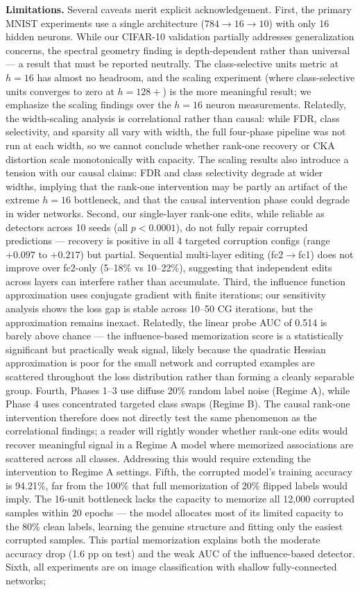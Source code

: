 \documentclass{article}
\begin{document}
\textbf{Limitations.} Several caveats merit explicit acknowledgement. First, the primary MNIST experiments use a single architecture ($784\to16\to10$) with only 16 hidden neurons. While our CIFAR-10 validation partially addresses generalization concerns, the spectral geometry finding is depth-dependent rather than universal — a result that must be reported neutrally. The class-selective units metric at $h=16$ has almost no headroom, and the scaling experiment (where class-selective units converges to zero at $h=128+$) is the more meaningful result; we emphasize the scaling findings over the $h=16$ neuron measurements. Relatedly, the width-scaling analysis is correlational rather than causal: while FDR, class selectivity, and sparsity all vary with width, the full four-phase pipeline was not run at each width, so we cannot conclude whether rank-one recovery or CKA distortion scale monotonically with capacity. The scaling results also introduce a tension with our causal claims: FDR and class selectivity degrade at wider widths, implying that the rank-one intervention may be partly an artifact of the extreme $h=16$ bottleneck, and that the causal intervention phase could degrade in wider networks. Second, our single-layer rank-one edits, while reliable as detectors across 10 seeds (all $p<0.0001$), do not fully repair corrupted predictions — recovery is positive in all 4 targeted corruption configs (range $+0.097$ to $+0.217$) but partial. Sequential multi-layer editing (fc2$\to$fc1) does not improve over fc2-only (5--18\% vs 10--22\%), suggesting that independent edits across layers can interfere rather than accumulate. Third, the influence function approximation uses conjugate gradient with finite iterations; our sensitivity analysis shows the loss gap is stable across 10--50 CG iterations, but the approximation remains inexact. Relatedly, the linear probe AUC of 0.514 is barely above chance — the influence-based memorization score is a statistically significant but practically weak signal, likely because the quadratic Hessian approximation is poor for the small network and corrupted examples are scattered throughout the loss distribution rather than forming a cleanly separable group. Fourth, Phases 1--3 use diffuse 20\% random label noise (Regime A), while Phase 4 uses concentrated targeted class swaps (Regime B). The causal rank-one intervention therefore does not directly test the same phenomenon as the correlational findings; a reader will rightly wonder whether rank-one edits would recover meaningful signal in a Regime A model where memorized associations are scattered across all classes. Addressing this would require extending the intervention to Regime A settings. Fifth, the corrupted model's training accuracy is 94.21\%, far from the 100\% that full memorization of 20\% flipped labels would imply. The 16-unit bottleneck lacks the capacity to memorize all 12,000 corrupted samples within 20 epochs — the model allocates most of its limited capacity to the 80\% clean labels, learning the genuine structure and fitting only the easiest corrupted samples. This partial memorization explains both the moderate accuracy drop (1.6 pp on test) and the weak AUC of the influence-based detector. Sixth, all experiments are on image classification with shallow fully-connected networks; 
\end{document}
